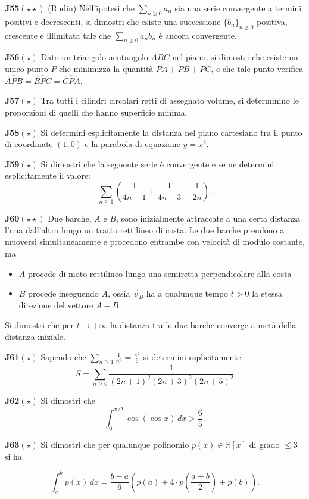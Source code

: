 \documentclass[a4paper,twoside]{article}
\theoremstyle{definition}
\numberwithin{theorem}{section}
\begin{document}
\textbf{J55}$(\star\star)$ (Rudin) Nell'ipotesi che $\sum_{n\geq 0}a_n$ sia una serie convergente a termini positivi e decrescenti, si dimostri che esiste una successione $\{b_n\}_{n\geq 0}$ positiva, crescente e illimitata tale che $\sum_{n\geq 0}a_n b_n$ è ancora convergente.

\textbf{J56}$(\star)$ Dato un triangolo acutangolo $ABC$ nel piano, si dimostri che esiste un unico punto $P$ che minimizza la quantità $PA+PB+PC$, e che tale punto verifica $\widehat{APB}=\widehat{BPC}=\widehat{CPA}$.

\textbf{J57}$(\star)$ Tra tutti i cilindri circolari retti di assegnato volume, si determinino le proporzioni di quelli che hanno superficie minima.

\textbf{J58}$(\star)$ Si determini esplicitamente la distanza nel piano cartesiano tra il punto di coordinate $(1,0)$ e la parabola di equazione $y=x^2$.

\textbf{J59}$(\star)$ Si dimostri che la seguente serie è convergente e se ne determini esplicitamente il valore:
$$\sum_{n\geq 1}\left(\frac{1}{4n-1}+\frac{1}{4n-3}-\frac{1}{2n}\right).$$

\textbf{J60}$(\star\star)$ Due barche, $A$ e $B$, sono inizialmente attraccate a una certa distanza l'una dall'altra lungo un tratto rettilineo di costa. Le due barche prendono a muoversi simultaneamente e procedono entrambe con velocità di modulo costante, ma
\begin{itemize}
\item $A$ procede di moto rettilineo lungo una semiretta perpendicolare alla costa
\item $B$ procede inseguendo $A$, ossia $\vec{v}_B$ ha a qualunque tempo $t>0$ la stessa direzione del vettore $A-B$.
\end{itemize}
Si dimostri che per $t\to +\infty$ la distanza tra le due barche converge a metà della distanza iniziale.  

\textbf{J61}$(\star)$ Sapendo che $\sum_{n\geq 1}\frac{1}{n^2}=\frac{\pi^2}{6}$ si determini esplicitamente
$$ S = \sum_{n\geq 0}\frac{1}{(2n+1)^2 (2n+3)^2 (2n+5)^2} $$

\textbf{J62}$(\star)$ Si dimostri che 
$$ \int_{0}^{\pi/2}\cos(\cos x)\,dx > \frac{6}{5}.$$

\textbf{J63}$(\star)$ Si dimostri che per qualunque polinomio $p(x)\in\mathbb{R}[x]$ di grado $\leq 3$ si ha 

$$ \int_{a}^{b} p(x)\,dx = \frac{b-a}{6}\left(p(a)+4\cdot p\left(\frac{a+b}{2}\right)+p(b)\right). $$
\end{document}
